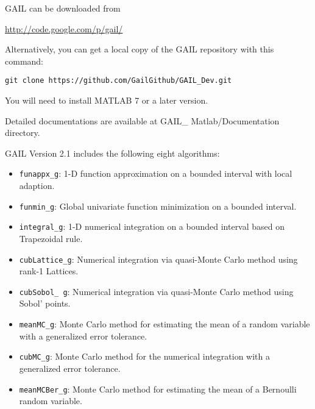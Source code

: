 \documentclass{iitthesis}
\theoremstyle{definition}
\begin{document}
GAIL can be downloaded from

\url{http://code.google.com/p/gail/}

Alternatively, you can get a local copy of the GAIL repository with this command:
\begin{lstlisting}
git clone https://github.com/GailGithub/GAIL_Dev.git
\end{lstlisting}
You will need to install MATLAB 7 or a later version.


Detailed documentations are available at GAIL\_ Matlab/Documentation directory.

GAIL Version 2.1 \cite{GAIL_2_1} includes the following eight algorithms:
\begin{itemize}
\item {\tt funappx\_g}: 1-D function approximation on a bounded interval with local adaption.
\item {\tt funmin\_g}: Global univariate function minimization on a bounded interval.
\item {\tt integral\_g}: 1-D numerical integration on a bounded interval based on Trapezoidal rule.
\item {\tt cubLattice\_g}: Numerical integration via quasi-Monte Carlo method using rank-1 Lattices.
\item {\tt cubSobol\_ g}: Numerical integration via quasi-Monte Carlo method using Sobol’ points.
\item {\tt meanMC\_g}: Monte Carlo method for estimating the mean of a random variable with a generalized error tolerance.
\item {\tt cubMC\_g}: Monte Carlo method for the numerical integration with a generalized error tolerance.
\item  {\tt meanMCBer\_g}: Monte Carlo method for estimating the mean of a Bernoulli random variable.
\end{itemize}
\end{document}
